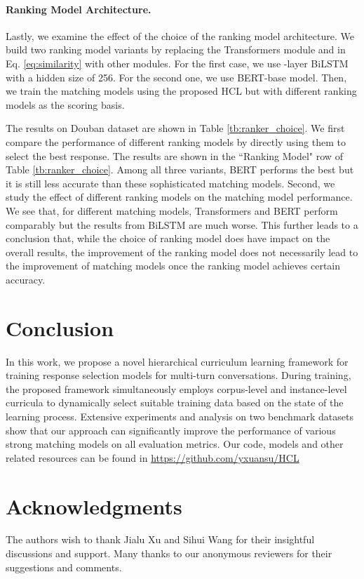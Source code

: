 \documentclass[11pt,a4paper]{article}
\begin{document}
\paragraph{Ranking Model Architecture.}
\label{sec:ranker_choice}
Lastly, we examine the effect of the choice of the ranking model architecture. We build two ranking model variants by replacing the Transformers module  and  in Eq. \eqref{eq:similarity} with other modules. For the first case, we use -layer BiLSTM with a hidden size of 256. For the second one, we use BERT-base \cite{DBLP:conf/naacl/DevlinCLT19} model. Then, we train the matching models using the proposed HCL but with different ranking models as the scoring basis.


The results on Douban dataset are shown in Table \ref{tb:ranker_choice}. We first compare the performance of different ranking models by directly using them to select the best response. The results are shown in the ``Ranking Model" row of Table \ref{tb:ranker_choice}. Among all three variants, BERT performs the best but it is still less accurate than these sophisticated matching models.  
Second, we study the effect of different ranking models on the matching model performance. We see that, for different matching models, Transformers and BERT perform comparably but the results from BiLSTM are much worse. This further leads to a conclusion that, while the choice of ranking model does have impact on the overall results, the improvement of the ranking model  does not necessarily lead to the improvement of matching models once the ranking model achieves certain accuracy. 



\section{Conclusion}
In this work, we propose a novel hierarchical curriculum learning framework for training response selection models for multi-turn conversations. During training, the proposed framework simultaneously employs corpus-level and instance-level curricula to dynamically select suitable training data based on the state of the learning process. Extensive experiments and analysis on two benchmark datasets show that our approach can significantly improve the performance of various strong matching models on all evaluation metrics. Our code, models and other related resources can be found in  \url{https://github.com/yxuansu/HCL}


\section*{Acknowledgments}
The authors wish to thank Jialu Xu and Sihui Wang for their insightful discussions and support. Many thanks to our anonymous reviewers for their suggestions and comments.	
\end{document}

